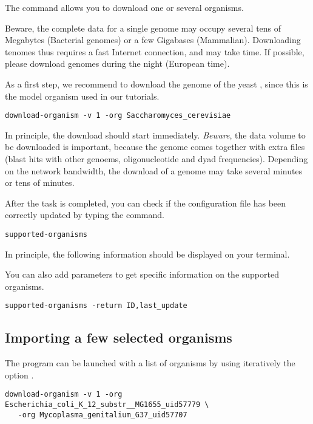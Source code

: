 The command  allows you to download one or
several organisms. 

Beware, the complete data for a single genome may occupy several tens
of Megabytes (Bacterial genomes) or a few Gigabases
(Mammalian). Downloading tenomes thus requires a fast Internet
connection, and may take time. If possible, please download genomes
during the night (European time).

As a first step, we recommend to download the genome of the yeast
, since this is the model organism used
in our tutorials.


\begin{lstlisting}
download-organism -v 1 -org Saccharomyces_cerevisiae
\end{lstlisting}

In principle, the download should start immediately. \emph{Beware},
the data volume to be downloaded is important, because the genome
comes together with extra files (blast hits with other genoems,
oligonucleotide and dyad frequencies). Depending on the network
bandwidth, the download of a genome may take several minutes or tens
of minutes. 

After the task is completed, you can check if the configuration file
has been correctly updated by typing the command.

\begin{lstlisting}
supported-organisms
\end{lstlisting}

In principle, the following information should be displayed on your
terminal.


You can also add parameters to get specific information on the
supported organisms.

\begin{lstlisting}
supported-organisms -return ID,last_update
\end{lstlisting}


\subsection{Importing a few selected organisms}

The program  can be launched with a list of
organisms by using iteratively the option .


\begin{lstlisting}
download-organism -v 1 -org Escherichia_coli_K_12_substr__MG1655_uid57779 \
   -org Mycoplasma_genitalium_G37_uid57707
\end{lstlisting}

